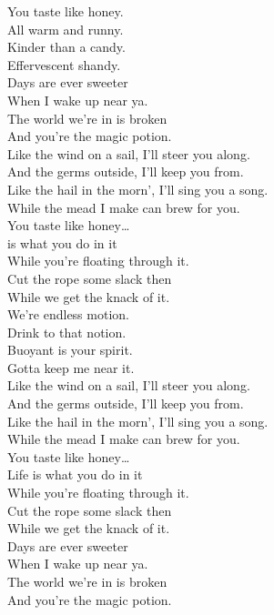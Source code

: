 


You taste like honey. \\
All warm and runny. \\
Kinder than a candy. \\
Effervescent shandy. \\
Days are ever sweeter \\
When I wake up near ya. \\
The world we're in is broken \\
And you're the magic potion. \\

Like the wind on a sail, I'll steer you along. \\
And the germs outside, I'll keep you from. \\
Like the hail in the morn', I'll sing you a song. \\
While the mead I make can brew for you. \\

You taste like honey… \\

 is what you do in it \\
While you're floating through it. \\
Cut the rope some slack then \\
While we get the knack of it. \\
We're endless motion. \\
Drink to that notion. \\
Buoyant is your spirit. \\
Gotta keep me near it. \\

Like the wind on a sail, I'll steer you along. \\
And the germs outside, I'll keep you from. \\
Like the hail in the morn', I'll sing you a song. \\
While the mead I make can brew for you. \\

You taste like honey… \\

Life is what you do in it \\
While you're floating through it. \\
Cut the rope some slack then \\
While we get the knack of it. \\
Days are ever sweeter \\
When I wake up near ya. \\
The world we're in is broken \\
And you're the magic potion. \\

